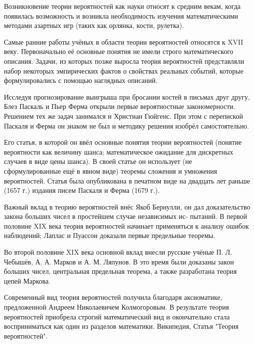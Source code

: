 
Возникновение теории вероятностей как науки относят к средним векам, когда появилась возможность и возникла необходимость изучения математическими методами азартных игр (таких как орлянка, кости, рулетка). 

Самые ранние работы учёных в области теории вероятностей относятся к XVII веку. Первоначально её основные понятия не имели строго математического описания. Задачи, из которых позже выросла теория вероятностей представляли набор некоторых эмпирических фактов о свойствах реальных событий, которые формулировались с помощью наглядных описаний. 

Исследуя прогнозирование выигрыша при бросании костей в письмах друг другу, Блез Паскаль и Пьер Ферма открыли первые вероятностные закономерности. Решением тех же задач занимался и Христиан Гюйгенс. При этом с перепиской Паскаля и Ферма он знаком не был и методику решения изобрёл самостоятельно. 

Его статья, в которой он ввёл основные понятия теории вероятностей (понятие вероятности как величину шанса; математическое ожидание для дискретных случаев в виде цены шанса). В своей статье он использует (не сформулированные ещё в явном виде) теоремы сложения и умножения вероятностей. Статья была опубликована в печатном виде на двадцать лет раньше (1657 г.) издания писем Паскаля и Ферма (1679 г.). 

Важный вклад в теорию вероятностей внёс Якоб Бернулли, он дал доказательство закона больших чисел в простейшем случае независимых ис- пытаний. В первой половине XIX века теория вероятностей начинает применяться к анализу ошибок наблюдений; Лаплас и Пуассон доказали первые предельные теоремы. 

Во второй половине XIX века основной вклад внесли русские учёные П. Л. Чебышёв, А. А. Марков и А. М. Ляпунов. В это время были доказаны закон больших чисел, центральная предельная теорема, а также разработана теория цепей Маркова. 

Современный вид теория вероятностей получила благодаря аксиоматике, предложенной Андреем Николаевичем Колмогоровым. В результате теория вероятностей приобрела строгий математический вид и окончательно стала восприниматься как один из разделов математики.
Википедия,
Статья "Теория вероятностей".